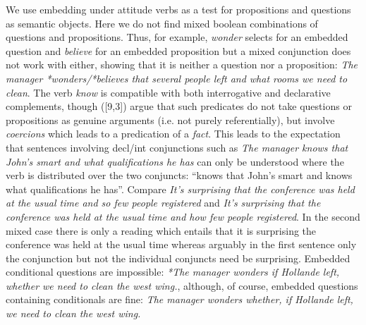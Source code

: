 \documentclass[a4wide]{article}
\newcommand{\ignore}[1]{}
\begin{document}
We use embedding under attitude verbs as a test for propositions and
questions as semantic objects.  Here we do not find mixed
boolean combinations of questions and propositions.  Thus, for
example, \textit{wonder} selects for an embedded question and
\textit{believe} for an embedded proposition but a mixed conjunction
does not work with either, showing that it is neither a question nor a proposition: \textit{The manager *wonders/*believes that several  people left and what rooms we need to
clean}.  The verb \textit{know} is compatible with both interrogative
and declarative complements, though ([9,3]) \ignore{\cite{vendler72,gs00}} argue that such predicates do not take
questions or propositions as genuine arguments (i.e. not purely
referentially), but involve {\it coercions}   which leads to a predication of a {\it fact}.
This leads to the expectation that sentences involving decl/int conjunctions such as \textit{The manager knows that John's smart and what    qualifications he has} can only be understood
where the verb is  distributed over the two conjuncts: ``knows that John's smart and
  knows what qualifications he has''.  Compare \textit{It's surprising
    that the conference was held at the usual time and so few people
    registered} and \textit{It's surprising that the conference was
    held at the usual time and how few people registered}.  In the
  second mixed case there is only a reading which entails that it is
  surprising the conference was held at the usual time whereas
  arguably in the first sentence \ignore{(if it is acceptable)} only the conjunction but not the
  individual conjuncts need be surprising. 
Embedded conditional questions are
  impossible: \textit{*The manager wonders if Hollande left, whether we need to
    clean the west wing.}, although, of course, embedded questions
  containing conditionals are fine:  \textit{The manager wonders whether, if Hollande left, we need to
    clean the west wing.}

\end{document}
